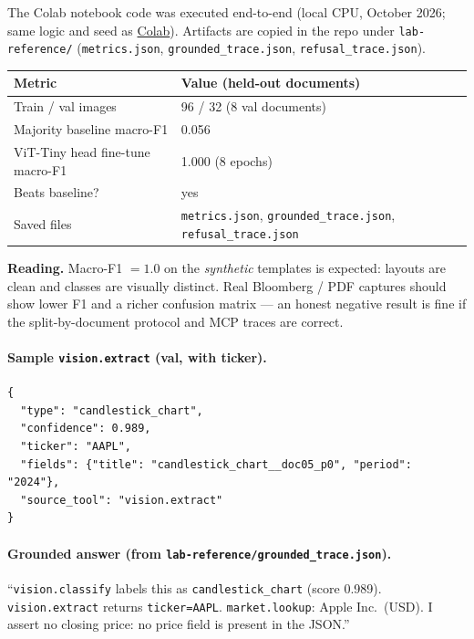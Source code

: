 \documentclass[11pt,a4paper]{article}
\begin{document}
The Colab notebook code was executed end-to-end (local CPU, October 2026; same
logic and seed as \href{https://colab.research.google.com/github/Amzil-AI/Vision-desk/blob/main/vision_desk_colab.ipynb}{Colab}).
Artifacts are copied in the repo under \texttt{lab-reference/}
(\texttt{metrics.json}, \texttt{grounded\_trace.json}, \texttt{refusal\_trace.json}).

\begin{center}
\renewcommand{\arraystretch}{1.15}
\begin{tabular}{@{}p{4.2cm}p{10.4cm}@{}}
\toprule
\textbf{Metric} & \textbf{Value (held-out documents)} \\
\midrule
Train / val images & 96 / 32 (8 val documents) \\
Majority baseline macro-F1 & 0.056 \\
ViT-Tiny head fine-tune macro-F1 & 1.000 (8 epochs) \\
Beats baseline? & yes \\
Saved files & \texttt{metrics.json}, \texttt{grounded\_trace.json}, \texttt{refusal\_trace.json} \\
\bottomrule
\end{tabular}
\end{center}

{\color{warn}\textbf{Reading.}
Macro-F1 $=1.0$ on the \emph{synthetic} templates is expected: layouts are
clean and classes are visually distinct. Real Bloomberg / PDF captures should
show lower F1 and a richer confusion matrix --- an honest negative result is
fine if the split-by-document protocol and MCP traces are correct.}

\paragraph{Sample \texttt{vision.extract} (val, with ticker).}
\begin{verbatim}
{
  "type": "candlestick_chart",
  "confidence": 0.989,
  "ticker": "AAPL",
  "fields": {"title": "candlestick_chart__doc05_p0", "period": "2024"},
  "source_tool": "vision.extract"
}
\end{verbatim}

\paragraph{Grounded answer (from \texttt{lab-reference/grounded\_trace.json}).}
``\texttt{vision.classify} labels this as \texttt{candlestick\_chart} (score
0.989). \texttt{vision.extract} returns \texttt{ticker=AAPL}. \texttt{market.lookup}:
Apple Inc.\ (USD). I assert no closing price: no price field is present in the JSON.''
\end{document}

